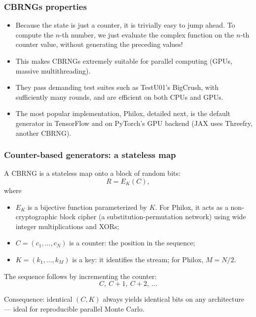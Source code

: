 \documentclass[aspectratio=169]{beamer}
\def\blue{\color{blue}}
\begin{document}
\begin{frame}
\frametitle{CBRNGs properties}

\begin{itemize}
\item Because the state is just a counter, it is {\blue trivially easy to jump ahead}. To compute the $n$-th number, we just evaluate the complex function on the $n$-th counter value, without generating the preceding values!
\item This makes CBRNGs extremely suitable for {\blue parallel computing} (GPUs, massive multithreading).
\item They pass demanding test suites such as TestU01's BigCrush, with sufficiently many rounds, and are efficient on both CPUs and GPUs.
\item The most popular implementation, Philox, detailed next, is the default generator in TensorFlow and on PyTorch's GPU backend (JAX uses Threefry, another CBRNG).
\end{itemize}

\end{frame}

\begin{frame}
\frametitle{Counter-based generators: a stateless map}

A CBRNG is a {\blue stateless map} onto a block of random bits:
\[
R = E_{K}(C),
\]
where
\begin{itemize}
\item
$E_K$ is a {\blue bijective function} parameterized by $K$. For Philox, it acts as a non-cryptographic block cipher (a substitution-permutation network) using wide integer multiplications and XORs;
\item
$C = (c_1,\ldots,c_N)$ is a {\blue counter}: the position in the sequence;
\item
$K = (k_1,\ldots,k_M)$ is a {\blue key}: it identifies the stream; for Philox,
$M = N/2$.
\end{itemize}

\mbox{}

The sequence follows by {\blue incrementing} the counter:
\[
C,\ C+1,\ C+2,\ \ldots
\]

\vfill

{\blue Consequence:} identical $(C,K)$ always yields identical bits on any
architecture --- ideal for reproducible parallel Monte Carlo.

\end{frame}
\end{document}
